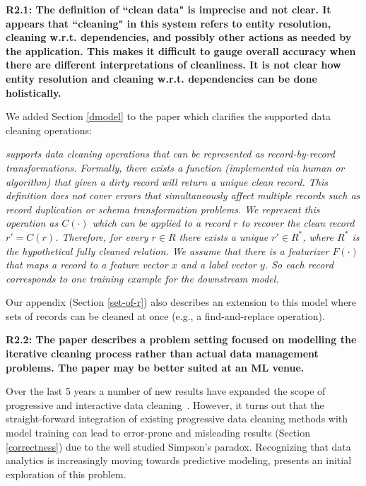 \noindent\textbf{R2.1: The definition of ``clean data" is imprecise and not clear. It appears that ``cleaning" in this system refers to entity resolution, cleaning w.r.t. dependencies, and possibly other actions as needed by the application. This makes it difficult to gauge overall accuracy when there are different interpretations of cleanliness. It is not clear how entity resolution and cleaning w.r.t. dependencies can be done holistically.}

We added Section \ref{dmodel} to the paper which clarifies the supported data cleaning operations:

\emph{\sys supports data cleaning operations that can be represented as record-by-record transformations.
Formally, there exists a function (implemented via human or algorithm) that given a dirty record will return a unique clean record.
This definition does not cover errors that simultaneously affect multiple records such as record duplication or schema transformation problems.
We represent this operation as $C(\cdot)$ which can be applied to a record $r$ to recover the clean record $r' = C(r)$.
Therefore, for every $r \in R$ there exists a unique $r' \in R^*$, where $R^*$ is the hypothetical fully cleaned relation.
We assume that there is a featurizer $F(\cdot)$ that maps a record to a feature vector $x$ and a label vector $y$.
So each record corresponds to one training example for the downstream model.}

\vspace{0.5em}

Our appendix (Section \ref{set-of-r}) also describes an extension to this model where sets of records can be cleaned at once (e.g., a find-and-replace operation).

\vspace{0.5em}

\noindent\textbf{R2.2: The paper describes a problem setting focused on modelling the iterative cleaning process rather than actual data management problems. The paper may be better suited at an ML venue.}

Over the last 5 years a number of new results have expanded the scope of progressive and interactive data cleaning~\cite{mayfield2010eracer, DBLP:journals/pvldb/YakoutENOI11, yakout2013don, altowim2014progressive, whang2014incremental, papenbrock2015progressive, gruenheid2014incremental}.
However,  it turns out that the straight-forward integration of existing progressive data cleaning methods with model training can lead to error-prone and misleading results (Section \ref{correctness}) due to the well studied Simpson's paradox.
Recognizing that data analytics is increasingly moving towards predictive modeling, \sys presents an initial exploration of this problem.  

